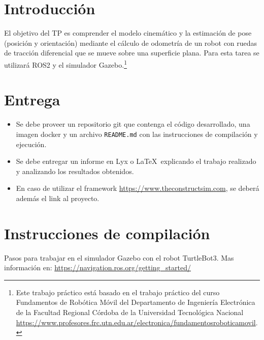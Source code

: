 \documentclass[tp]{lcc}
\begin{document}
\maketitle


\section{Introducción}

El objetivo del TP es comprender el modelo cinemático y la estimación de pose (posición y orientación) mediante el cálculo de odometría de un robot con ruedas de tracción diferencial que se mueve sobre una superficie plana. Para esta tarea se utilizará ROS2 y el simulador Gazebo.\footnote{Este trabajo práctico está basado en el trabajo práctico del curso Fundamentos de Robótica Móvil del Departamento de Ingeniería Electrónica de la Facultad Regional Córdoba de la Universidad Tecnológica Nacional \url{https://www.profesores.frc.utn.edu.ar/electronica/fundamentosroboticamovil}.}


\section{Entrega}
\begin{itemize}
    \item Se debe proveer un repositorio git que contenga el código desarrollado, una imagen docker y un archivo \lstinline{README.md} con las instrucciones de compilación y ejecución.

    \item Se debe entregar un informe en Lyx o \LaTeX\  explicando el trabajo realizado y analizando los resultados obtenidos.
    
    \item En caso de utilizar el framework \url{https://www.theconstructsim.com}, se deberá además el link al proyecto.
\end{itemize}


\section{Instrucciones de compilación}
Pasos para trabajar en el simulador Gazebo con el robot TurtleBot3. Mas información en: \url{https://navigation.ros.org/getting_started/}
\end{document}

